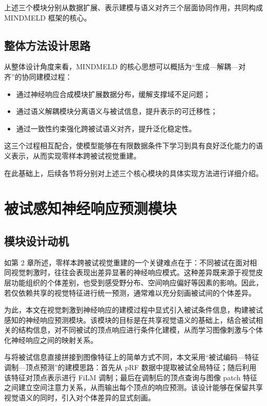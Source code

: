 上述三个模块分别从数据扩展、表示建模与语义对齐三个层面协同作用，共同构成 MINDMELD 框架的核心。

\subsection{整体方法设计思路}

从整体设计角度来看，MINDMELD 的核心思想可以概括为“生成—解耦—对齐”的协同建模过程：

\begin{itemize}
  \item 通过神经响应合成模块扩展数据分布，缓解支撑域不足问题；
  \item 通过语义解耦模块分离语义与被试信息，提升表示的可迁移性；
  \item 通过一致性约束强化跨被试语义对齐，提升泛化稳定性。
\end{itemize}

这三个过程相互配合，使模型能够在有限数据条件下学习到具有良好泛化能力的语义表示，从而实现零样本跨被试视觉重建。

在此基础上，后续各节将分别对上述三个核心模块的具体实现方法进行详细介绍。

\section{被试感知神经响应预测模块}

\subsection{模块设计动机}

如第 2 章所述，零样本跨被试视觉重建的一个关键难点在于：不同被试在面对相同视觉刺激时，往往会表现出差异显著的神经响应模式。这种差异既来源于视觉皮层功能组织的个体差别，也受到感受野分布、空间响应偏好等因素的影响。因此，若仅依赖共享的视觉特征进行统一预测，通常难以充分刻画被试间的个体差异。

为此，本文在视觉刺激到神经响应的建模过程中显式引入被试条件信息，构建被试感知的神经响应预测模块。该模块的目标是在共享视觉语义的基础上，结合被试相关的结构信息，对不同被试的顶点响应进行条件化建模，从而学习图像刺激与个体化神经响应之间的映射关系。

与将被试信息直接拼接到图像特征上的简单方式不同，本文采用“被试编码—特征调制—顶点预测”的建模思路：首先从 pRF 数据中提取被试全局特征；随后利用该特征对顶点表示进行 FiLM 调制；最后在调制后的顶点查询与图像 patch 特征之间建立空间注意力关系，从而输出每个顶点的响应预测。该设计能够在保留共享视觉语义的同时，引入对个体差异的显式刻画。

